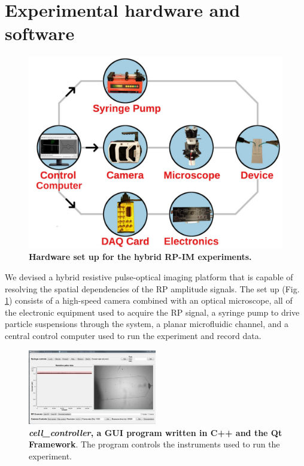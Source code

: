 		
		
	\section{Experimental hardware and software}
	      
		\begin{figure}
			\includegraphics[width=\textwidth]{hardware.jpg}
			\caption{\textbf{Hardware set up for the hybrid RP-IM experiments.}}
			\label{fig:hardware}
		\end{figure}

	
		We devised a hybrid resistive pulse-optical imaging platform that is capable of resolving the spatial dependencies of the RP amplitude signals. The set up (Fig. \ref{fig:hardware}) consists of a high-speed camera combined with an optical microscope, all of the electronic equipment used to acquire the RP signal, a syringe pump to drive particle suspensions through the system, a planar microfluidic channel, and a central control computer used to run the experiment and record data.
		
		\begin{figure}
			\includegraphics[width=0.5\textwidth]{cellcontroller.png}
			\caption{\textbf{\textit{cell\_controller}, a GUI program written in C++ and the Qt Framework}. The program controls the instruments used to run the experiment.}
			\label{fig:cellcontroller}
		\end{figure}

